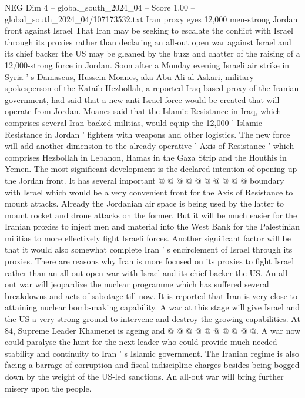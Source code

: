 \begin{textsample}{NEG Dim 4 – global\_south\_2024\_04 – Score 1.00 – global\_south\_2024\_04/107173532.txt}  \label{ex:f4_neg_200}
Iran proxy eyes 12,000 men-strong Jordan front against Israel That Iran may be seeking to escalate the conflict with Israel through its proxies rather than declaring an all-out open war against Israel and its chief backer the US may be gleaned by the buzz and chatter of the raising of a 12,000-strong force in Jordan.
Soon after a Monday evening Israeli air strike in Syria ' s Damascus, Hussein Moanes, aka Abu Ali al-Askari, military spokesperson of the Kataib Hezbollah, a reported Iraq-based proxy of the Iranian government, had said that a new anti-Israel force would be created that will operate from Jordan.
Moanes said that the Islamic Resistance in Iraq, which comprises several Iran-backed militias, would equip the 12,000 ' Islamic Resistance in Jordan ' fighters with weapons and other logistics.
The new force will add another dimension to the already operative ' Axis of Resistance ' which comprises Hezbollah in Lebanon, Hamas in the Gaza Strip and the Houthis in Yemen.
The most significant development is the declared intention of opening up the Jordan front.
It has several important @ @ @ @ @ @ @ @ @ @ boundary with Israel which would be a very convenient front for the Axis of Resistance to mount attacks.
Already the Jordanian air space is being used by the latter to mount rocket and drone attacks on the former.
But it will be much easier for the Iranian proxies to inject men and material into the West Bank for the Palestinian militias to more effectively fight Israeli forces.
Another significant factor will be that it would also somewhat complete Iran ' s encirclement of Israel through its proxies.
There are reasons why Iran is more focused on its proxies to fight Israel rather than an all-out open war with Israel and its chief backer the US.
An all-out war will jeopardize the nuclear programme which has suffered several breakdowns and acts of sabotage till now.
It is reported that Iran is very close to attaining nuclear bomb-making capability.
A war at this stage will give Israel and the US a very strong ground to intervene and destroy the growing capabilities.
At 84, Supreme Leader Khamenei is ageing and @ @ @ @ @ @ @ @ @ @.
A war now could paralyse the hunt for the next leader who could provide much-needed stability and continuity to Iran ' s Islamic government.
The Iranian regime is also facing a barrage of corruption and fiscal indiscipline charges besides being bogged down by the weight of the US-led sanctions.
An all-out war will bring further misery upon the people.

\end{textsample}
